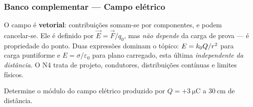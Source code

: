 
\subsubsection*{Banco complementar --- Campo elétrico}

\begin{atencao}
O campo é \textbf{vetorial}: contribuições somam-se por componentes, e podem
cancelar-se. Ele é definido por $\vec E=\vec F/q_0$, mas \emph{não depende} da
carga de prova --- é propriedade do ponto. Duas expressões dominam o tópico:
$E=k_{0} Q/r^{2}$ para carga puntiforme e $E=\sigma/\varepsilon_0$ para plano
carregado, esta última \emph{independente da distância}. O N4 trata de projeto,
condutores, distribuições contínuas e limites físicos.
\end{atencao}

\blocofixacao

\begin{questao}[1]{}
Determine o módulo do campo elétrico produzido por $Q=+\SI{3}{\micro\coulomb}$
a $\SI{30}{\centi\meter}$ de distância.
\end{questao}

